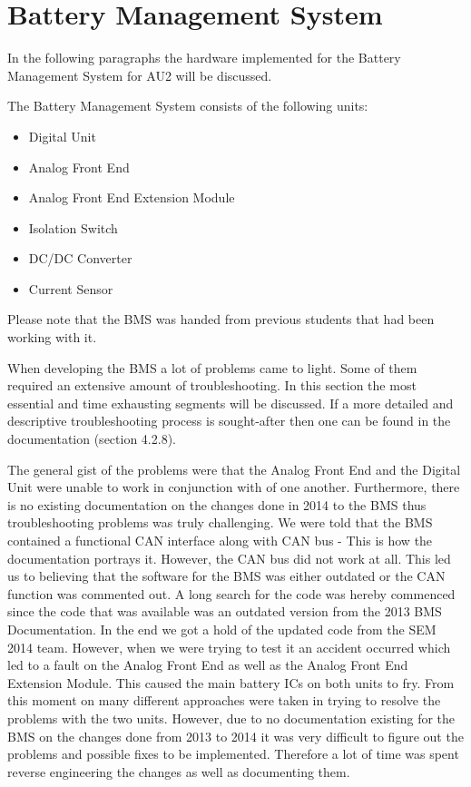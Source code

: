 \section{Battery Management System}
In the following paragraphs the hardware implemented for the Battery Management System for AU2 will be discussed. 

The Battery Management System consists of the following units:
\begin{itemize}
	\item{Digital Unit}
	\item{Analog Front End}
	\item{Analog Front End Extension Module}
	\item{Isolation Switch}
	\item{DC/DC Converter}
	\item{Current Sensor}
\end{itemize}

Please note that the BMS was handed from previous students that had been working with it. 

When developing the BMS a lot of problems came to light. Some of them required an extensive amount of troubleshooting. In this section the most essential and time exhausting segments will be discussed. If a more detailed and descriptive troubleshooting process is sought-after then one can be found in the documentation\cite{AU2} (section 4.2.8).

The general gist of the problems were that the Analog Front End and the Digital Unit were unable to work in conjunction with of one another. Furthermore, there is no existing documentation on the changes done in 2014 to the BMS thus troubleshooting problems was truly challenging.
We were told that the BMS contained a functional CAN interface along with CAN bus - This is how the documentation portrays it. However, the CAN bus did not work at all. This led us to believing that the software for the BMS was either outdated or the CAN function was commented out. A long search for the code was hereby commenced since the code that was available was an outdated version from the 2013 BMS Documentation\cite{BMSDocumentation}. In the end we got a hold of the updated code from the SEM 2014 team. However, when we were trying to test it an accident occurred which led to a fault on the Analog Front End as well as the Analog Front End Extension Module. This caused the main battery ICs on both units to fry.
From this moment on many different approaches were taken in trying to resolve the problems with the two units. However, due to no documentation existing for the BMS on the changes done from 2013 to 2014 it was very difficult to figure out the problems and possible fixes to be implemented. Therefore a lot of time was spent reverse engineering the changes as well as documenting them. 

